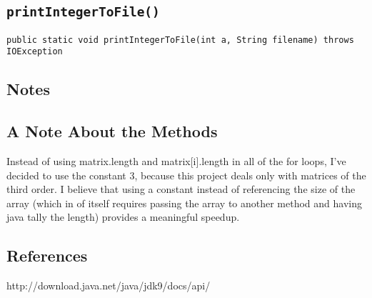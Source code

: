 \documentclass[12pt]{article}
\begin{document}
\subsection{\texttt{printIntegerToFile()}}
\begin{verbatim}
public static void printIntegerToFile(int a, String filename) throws IOException
\end{verbatim}




\newpage %



\begin{center}
\section{Notes}
\end{center}
\subsection{A Note About the Methods}
Instead of using matrix.length and matrix[i].length in all of the for loops, I've decided to use the constant 3, because this project deals only with matrices of the third order. I believe that using a constant instead of referencing the size of the array (which in of itself requires passing the array to another method and having java tally the length) provides a meaningful speedup.




\newpage %



\begin{center}
\section*{References}
\end{center}
http://download.java.net/java/jdk9/docs/api/
\end{document}
